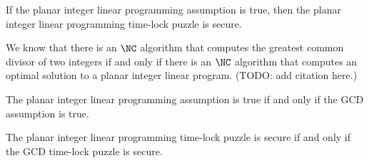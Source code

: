 \documentclass{article}
\begin{document}
\begin{conjecture}
  If the planar integer linear programming assumption is true, then the planar integer linear programming time-lock puzzle is secure.
\end{conjecture}

We know that there is an $\NC$ algorithm that computes the greatest common divisor of two integers if and only if there is an $\NC$ algorithm that computes an optimal solution to a planar integer linear program.
(TODO: add citation here.)

\begin{conjecture}
  The planar integer linear programming assumption is true if and only if the GCD assumption is true.
\end{conjecture}

\begin{conjecture}
  The planar integer linear programming time-lock puzzle is secure if and only if the GCD time-lock puzzle is secure.
\end{conjecture}

\end{document}
